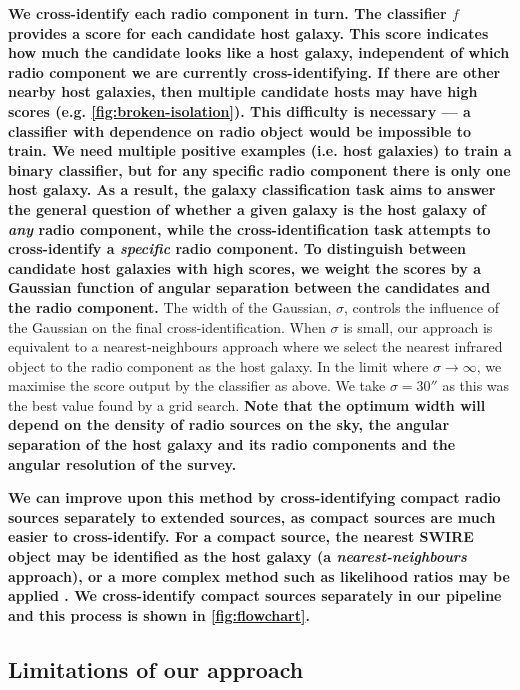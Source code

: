 \documentclass[fleqn,usenatbib,usedcolumn]{mnras}
\newcommand{\edited}[1]{{\bf {#1}}}
\begin{document}
    \edited{We cross-identify each radio component in turn. The classifier $f$
    provides a score for each candidate host galaxy. This score indicates how
    much the candidate looks like a host galaxy, independent of which radio
    component we are currently cross-identifying. If there are other nearby host
    galaxies, then multiple candidate hosts may have high scores (e.g.
    \autoref{fig:broken-isolation}). This difficulty is necessary --- a classifier
    with dependence on radio object would be impossible to train. We
    need multiple positive examples (i.e. host galaxies) to train a binary classifier, but
    for any specific radio component there is only one host galaxy. As a
    result, the galaxy classification task aims to answer the general question
    of whether a given galaxy is the host galaxy of \emph{any} radio
    component, while the cross-identification task attempts to cross-identify
    a \emph{specific} radio component. To distinguish between candidate host
    galaxies with high scores, we weight the scores by a Gaussian function of
    angular separation between the candidates and the radio component.} The
    width of the Gaussian, $\sigma$, controls the influence of the Gaussian on
    the final cross-identification. When $\sigma$ is small, our approach is
    equivalent to a nearest-neighbours approach where we select the nearest
    infrared object to the radio component as the host galaxy. In the limit
    where $\sigma \to \infty$, we maximise the score output by the
    classifier as above. We take $\sigma = 30''$ as this was the best value
    found by a grid search. \edited{Note that the optimum width will depend on
    the density of radio sources on the sky, the angular separation of the
    host galaxy and its radio components and the angular resolution of the survey.}

    \edited{We can improve upon this method by cross-identifying compact radio sources
    separately to extended sources, as compact sources are much easier to
    cross-identify. For a compact source, the nearest SWIRE object may be
    identified as the host galaxy (a \emph{nearest-neighbours} approach), or a
    more complex method such as likelihood ratios may be applied
    \citep[see][]{weston18lrpy}. We cross-identify compact sources separately
    in our pipeline and this process is shown in \autoref{fig:flowchart}.}

  \subsection{Limitations of our approach}
    \label{sec:limitations}
\end{document}
